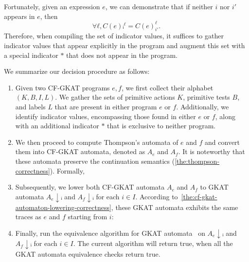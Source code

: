 Fortunately, given an expression \(e\), we can demonstrate that if neither \(i\) nor \(i'\) appears in \(e\), then 
\[∀ ℓ, C(e)ᵢ^{ℓ} = C(e)_{i'}^{ℓ}.\]
Therefore, when compiling the set of indicator values, it suffices to gather indicator values that appear explicitly in the program and augment this set with a special indicator \(*\) that does not appear in the program.

We summarize our decision procedure as follows:
\begin{enumerate}
  \item Given two CF-GKAT programs \(e, f\), we first collect their alphabet \((K, B, I, L)\). We gather the sets of primitive actions \(K\), primitive tests \(B\), and labels \(L\) that are present in either program \(e\) or \(f\). 
  Additionally, we identify indicator values, encompassing those found in either \(e\) or \(f\), along with an additional indicator \(*\) that is exclusive to neither program.
  \item We then proceed to compute Thompson's automata of \(e\) and \(f\) and convert them into CF-GKAT automata, denoted as \(A_e\) and \(A_f\). 
  It is noteworthy that these automata preserve the continuation semantics (\cref{the:thompson-correctness}). Formally,
  \item Subsequently, we lower both CF-GKAT automata \(A_e\) and \(A_f\) to GKAT automata \(A_e\!↓ᵢ\) and \(A_f\!↓ᵢ\) for each \(i ∈ I\). 
  According to~\cref{the:cf-gkat-automaton-lowering-correctness}, these GKAT automata exhibits the same traces as \(e\) and \(f\) starting from \(i\):
  \item Finally, run the equivalence algorithm for GKAT automata~\cite{Smolka_Foster_Hsu_Kappé_Kozen_Silva_2020} on \(A_e \!↓ᵢ\) and \(A_f \!↓ᵢ\) for each \(i ∈ I\). 
  The current algorithm will return true, when all the GKAT automata equivalence checks return true.
\end{enumerate}

